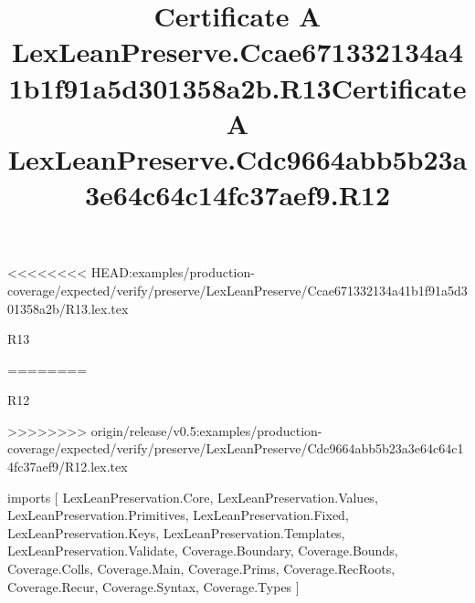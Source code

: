 <<<<<<<< HEAD:examples/production-coverage/expected/verify/preserve/LexLeanPreserve/Ccae671332134a41b1f91a5d301358a2b/R13.lex.tex
\begin{lexlean}{R13}
\title{Certificate A LexLeanPreserve.Ccae671332134a41b1f91a5d301358a2b.R13}
========
\begin{lexlean}{R12}
\title{Certificate A LexLeanPreserve.Cdc9664abb5b23a3e64c64c14fc37aef9.R12}
>>>>>>>> origin/release/v0.5:examples/production-coverage/expected/verify/preserve/LexLeanPreserve/Cdc9664abb5b23a3e64c64c14fc37aef9/R12.lex.tex
\begin{coremodule}
imports [
  LexLeanPreservation.Core,
  LexLeanPreservation.Values,
  LexLeanPreservation.Primitives,
  LexLeanPreservation.Fixed,
  LexLeanPreservation.Keys,
  LexLeanPreservation.Templates,
  LexLeanPreservation.Validate,
  Coverage.Boundary,
  Coverage.Bounds,
  Coverage.Colls,
  Coverage.Main,
  Coverage.Prims,
  Coverage.RecRoots,
  Coverage.Recur,
  Coverage.Syntax,
  Coverage.Types
]


\end{coremodule}
\end{lexlean}
\end{lexlean}
